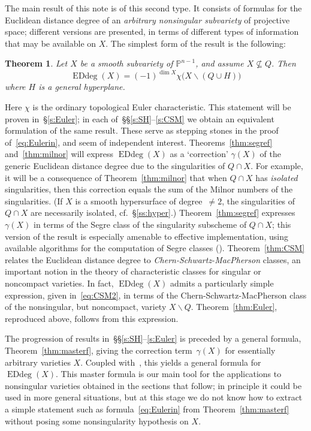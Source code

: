 \documentclass[11pt]{amsart}
\newtheorem*{theorem*}{Theorem}
\numberwithin{equation}{section}
\newcommand{\Pbb}{{\mathbb{P}}}
\DeclareMathOperator{\Edd}{EDdeg}
\begin{document}
The main result of this note is of this second type. It consists of formulas for 
the Euclidean distance degree of an {\em arbitrary nonsingular subvariety\/} 
of projective space; different versions are presented, in terms of different
types of information that may be available on $X$. The simplest form of the 
result is the following:
\begin{theorem*}
Let $X$ be a smooth subvariety of $\Pbb^{n-1}$, and assume $X\not\subseteq Q$. Then 
\begin{equation}\label{eq:Eulerin}
\Edd(X) = (-1)^{\dim X} \chi\big(X\smallsetminus (Q\cup H)\big)
\end{equation}
where $H$ is a general hyperplane.
\end{theorem*}
Here $\chi$ is the ordinary topological Euler characteristic. This statement will be
proven in~\S\ref{s:Euler}; in each of~\S\S\ref{s:SH}--\ref{s:CSM} 
we obtain an equivalent formulation of the same result. These serve as stepping 
stones in the proof of~\eqref{eq:Eulerin}, and seem of independent interest. 
Theorems~\ref{thm:segref} and~\ref{thm:milnor} will express $\Edd(X)$ as a 
`correction' $\gamma(X)$ of the generic Euclidean distance degree due to the 
singularities of $Q\cap X$. For example, it will be a consequence of 
Theorem~\ref{thm:milnor} that when $Q\cap X$ has {\em isolated\/} singularities, 
then this correction equals the sum of the Milnor numbers of the singularities. 
(If $X$ is a smooth hypersurface of degree~$\ne 2$, the singularities of 
$Q\cap X$ are necessarily isolated, cf.~\S\ref{ss:hyper}.) Theorem~\ref{thm:segref} 
expresses $\gamma(X)$ in terms of the Segre class of the singularity subscheme
of $Q\cap X$; this version of the result is especially amenable to effective
implementation, using available algorithms for the computation of Segre classes 
(\cite{Harris201726}). Theorem~\ref{thm:CSM} relates the Euclidean distance 
degree to {\em Chern-Schwartz-MacPherson\/} classes, an important notion in the
theory of characteristic classes for singular or noncompact varieties. In fact, 
$\Edd(X)$ admits a particularly simple expression, given in~\eqref{eq:CSM2},
in terms of the Chern-Schwartz-MacPherson class of the nonsingular, but noncompact,
variety $X\smallsetminus Q$. Theorem~\ref{thm:Euler}, reproduced above, follows
from this expression.

The progression of results in~\S\S\ref{s:SH}--\ref{s:Euler} is preceded by a general
formula, Theorem~\ref{thm:masterf}, giving the correction term~$\gamma(X)$ for 
essentially arbitrary varieties $X$. Coupled with~\cite[Proposition~2.9]{produa},
this yields a general formula for $\Edd(X)$. This master formula is our main tool
for the applications to nonsingular varieties obtained in the sections that follow;
in principle it could be used in more general situations, but at this stage we do 
not know how to extract a simple statement such as formula~\ref{eq:Eulerin} from
Theorem~\ref{thm:masterf} without posing some nonsingularity hypothesis on $X$.
\end{document}
